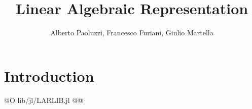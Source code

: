 \documentclass[10pt]{book}
\author{Alberto Paoluzzi, Francesco Furiani, Giulio Martella}
\title{Linear Algebraic Representation}
\begin{document}
\frontmatter
\maketitle
\tableofcontents

\mainmatter

\chapter{Introduction}

@O lib/jl/LARLIB.jl
@{@}


\backmatter


{}

\end{document}
